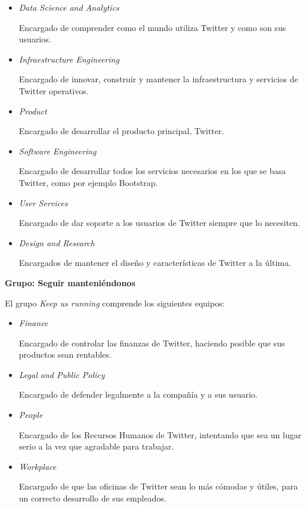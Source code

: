 \begin{itemize}

\item \textit{Data Science and Analytics}

Encargado de comprender como el mundo utiliza Twitter y como son sus usuarios.

\item \textit{Infraestructure Engineering}

Encargado de innovar, construir y mantener la infraestructura y servicios de Twitter operativos.

\item \textit{Product}

Encargado de desarrollar el producto principal, Twitter.

\item \textit{Software Engineering}

Encargado de desarrollar todos los servicios necesarios  en los que se basa Twitter, como por ejemplo Bootstrap.

\item \textit{User Services}

Encargado de dar soporte a los usuarios de Twitter siempre que lo necesiten.

\item \textit{Design and Research}

Encargados de mantener el diseño y características de Twitter a la última.

\end{itemize}

\textbf{Grupo: Seguir manteniéndonos}

El grupo \textit{Keep us running} comprende los siguientes equipos:

\begin{itemize}

\item \textit{Finance}

Encargado de controlar las finanzas de Twitter, haciendo posible que sus productos sean rentables.

\item \textit{Legal and Public Policy}

Encargado de defender legalmente a la compañía y a sus usuario. 

\item \textit{People}

Encargado de los Recursos Humanos de Twitter, intentando que sea un lugar serio a la vez que agradable para trabajar.

\item \textit{Workplace}

Encargado de que las oficinas de Twitter sean lo más cómodas y útiles, para un correcto desarrollo de sus empleados.

\end{itemize}

